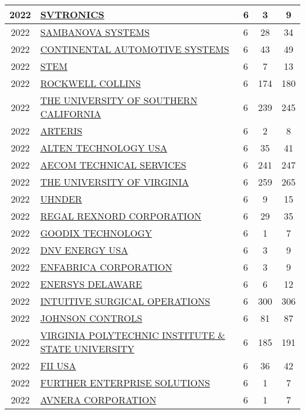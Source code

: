 \documentclass{article}%
\begin{document}
\begin{longtable}{c|p{20em}|p{5em}|c|c}
\hline%
2022&\hyperref[subsec:SVTRONICS]{SVTRONICS}&6&3&9\\%
\hline%
2022&\hyperref[subsec:SAMBANOVASYSTEMS]{SAMBANOVA SYSTEMS}&6&28&34\\%
\hline%
2022&\hyperref[subsec:CONTINENTALAUTOMOTIVESYSTEMS]{CONTINENTAL AUTOMOTIVE SYSTEMS}&6&43&49\\%
\hline%
2022&\hyperref[subsec:STEM]{STEM}&6&7&13\\%
\hline%
2022&\hyperref[subsec:ROCKWELLCOLLINS]{ROCKWELL COLLINS}&6&174&180\\%
\hline%
2022&\hyperref[subsec:THEUNIVERSITYOFSOUTHERNCALIFORNIA]{THE UNIVERSITY OF SOUTHERN CALIFORNIA}&6&239&245\\%
\hline%
2022&\hyperref[subsec:ARTERIS]{ARTERIS}&6&2&8\\%
\hline%
2022&\hyperref[subsec:ALTENTECHNOLOGYUSA]{ALTEN TECHNOLOGY USA}&6&35&41\\%
\hline%
2022&\hyperref[subsec:AECOMTECHNICALSERVICES]{AECOM TECHNICAL SERVICES}&6&241&247\\%
\hline%
2022&\hyperref[subsec:THEUNIVERSITYOFVIRGINIA]{THE UNIVERSITY OF VIRGINIA}&6&259&265\\%
\hline%
2022&\hyperref[subsec:UHNDER]{UHNDER}&6&9&15\\%
\hline%
2022&\hyperref[subsec:REGALREXNORDCORPORATION]{REGAL REXNORD CORPORATION}&6&29&35\\%
\hline%
2022&\hyperref[subsec:GOODIXTECHNOLOGY]{GOODIX TECHNOLOGY}&6&1&7\\%
\hline%
2022&\hyperref[subsec:DNVENERGYUSA]{DNV ENERGY USA}&6&3&9\\%
\hline%
2022&\hyperref[subsec:ENFABRICACORPORATION]{ENFABRICA CORPORATION}&6&3&9\\%
\hline%
2022&\hyperref[subsec:ENERSYSDELAWARE]{ENERSYS DELAWARE}&6&6&12\\%
\hline%
2022&\hyperref[subsec:INTUITIVESURGICALOPERATIONS]{INTUITIVE SURGICAL OPERATIONS}&6&300&306\\%
\hline%
2022&\hyperref[subsec:JOHNSONCONTROLS]{JOHNSON CONTROLS}&6&81&87\\%
\hline%
2022&\hyperref[subsec:VIRGINIAPOLYTECHNICINSTITUTESTATEUNIVERSITY]{VIRGINIA POLYTECHNIC INSTITUTE \& STATE UNIVERSITY}&6&185&191\\%
\hline%
2022&\hyperref[subsec:FIIUSA]{FII USA}&6&36&42\\%
\hline%
2022&\hyperref[subsec:FURTHERENTERPRISESOLUTIONS]{FURTHER ENTERPRISE SOLUTIONS}&6&1&7\\%
\hline%
2022&\hyperref[subsec:AVNERACORPORATION]{AVNERA CORPORATION}&6&1&7\\%

\end{longtable}
\end{document}
